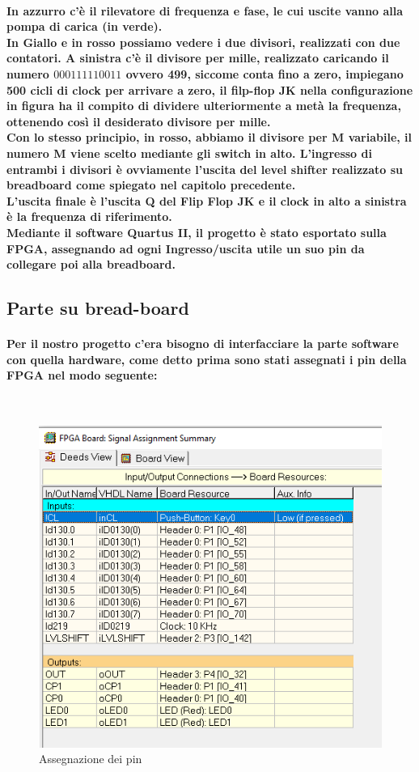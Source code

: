 \documentclass[a4paper]{article}
\begin{document}
\paragraph{In azzurro c'è il rilevatore di frequenza e fase, le cui uscite vanno alla pompa di carica (in verde).\\In Giallo e in rosso possiamo vedere i due divisori, realizzati con due contatori.
A sinistra c'è il divisore per mille, realizzato caricando il numero $000111110011$ ovvero 499, siccome conta fino a zero, impiegano 500 cicli di clock per arrivare a zero, il filp-flop JK nella configurazione in figura ha il compito di dividere ulteriormente a metà la frequenza, ottenendo così il desiderato divisore per mille.\\
Con lo stesso principio, in rosso, abbiamo il divisore per M variabile, il numero M viene scelto mediante gli switch in alto.
L'ingresso di entrambi i divisori è ovviamente l'uscita del level shifter realizzato su breadboard come spiegato nel capitolo precedente.\\L'uscita finale è l'uscita Q del Flip Flop JK e il clock in alto a sinistra è la frequenza di riferimento.\\Mediante il software Quartus II, il progetto è stato esportato sulla FPGA, assegnando ad ogni Ingresso/uscita utile un suo pin da collegare poi alla breadboard.}
 \subsection{Parte su bread-board}
 \paragraph{Per il nostro progetto c'era bisogno di interfacciare la parte software con quella hardware, come detto prima sono stati assegnati i pin della FPGA nel modo seguente:}
 ~\begin{figure}[H]%
\includegraphics[scale=0.6]{PinDeeds.png} 
\centering
\caption{Assegnazione dei pin}
\label{fig:foo}
\end{figure}
\end{document}
